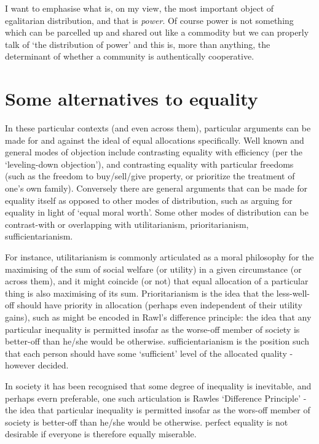 \documentclass{article}
\begin{document}
\begin{displayquote}
I want to emphasise what is, on my view, the most important object of egalitarian distribution, and that is \textit{power}. Of course power is not something which can be parcelled up and shared out like a commodity but we can properly talk of `the distribution of power' and this is, more than anything, the determinant of whether a community is authentically cooperative.\cite{TheSocialBasisofEquality:1998}
\end{displayquote}




\section{Some alternatives to equality}

In these particular contexts (and even across them), particular arguments can be made for and against the ideal of equal allocations specifically.
Well known and general modes of objection include contrasting equality with efficiency (per the `leveling-down objection'), and contrasting equality with particular freedoms (such as the freedom to buy/sell/give property, or prioritize the treatment of one's own family).
Conversely there are general arguments that can be made for equality itself as opposed to other modes of distribution, such as arguing for equality in light of `equal moral worth'.
Some other modes of distribution can be contrast-with or overlapping with utilitarianism, prioritarianism, sufficientarianism.

For instance, utilitarianism is commonly articulated as a moral philosophy for the maximising of the sum of social welfare (or utility) in a given circumstance (or across them), and it might coincide (or not) that equal allocation of a particular thing is also maximising of its sum.
Prioritarianism is the idea that the less-well-off should have priority in allocation (perhaps even independent of their utility gains), such as might be encoded in Rawl's difference principle: the idea that any particular inequality is permitted insofar as the worse-off member of society is better-off than he/she would be otherwise.
sufficientarianism is the position such that each person should have some `sufficient' level of the allocated quality - however decided.

In society it has been recognised that some degree of inequality is inevitable, and perhaps evern preferable, one such articulation is Rawles `Difference Principle' - the idea that particular inequality is permitted insofar as the wors-off member of society is better-off than he/she would be otherwise.
perfect equality is not desirable if everyone is therefore equally miserable.
\end{document}
